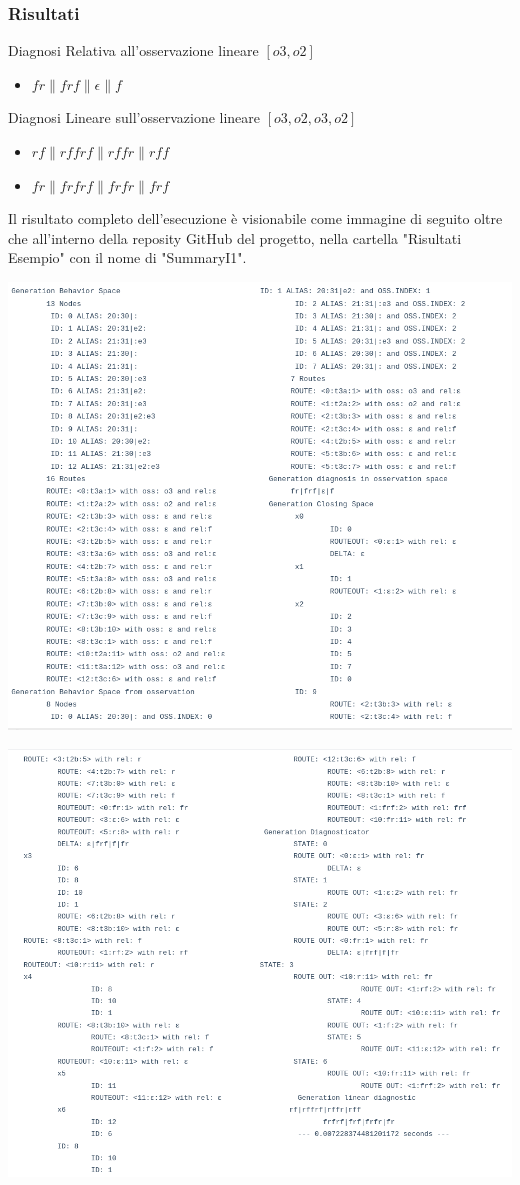 \subsubsection{Risultati}
Diagnosi Relativa all'osservazione lineare $[o3, o2]$
\begin{itemize}
    \item  $fr\|frf\|\epsilon\|f$
\end{itemize}
Diagnosi Lineare sull'osservazione lineare $[o3, o2, o3, o2]$
\begin{itemize}
    \item $rf\|rffrf\|rffr\|rff$
    \item $fr\|frfrf\|frfr\|frf$
\end{itemize}

Il risultato completo dell'esecuzione è visionabile come immagine di seguito oltre che all'interno della reposity GitHub del progetto, nella cartella "Risultati Esempio" con il nome di "SummaryI1".

\includegraphics[width=\textwidth]{immagini/BI1.png}

\includegraphics[width=\textwidth]{immagini/BI1_2.png}

